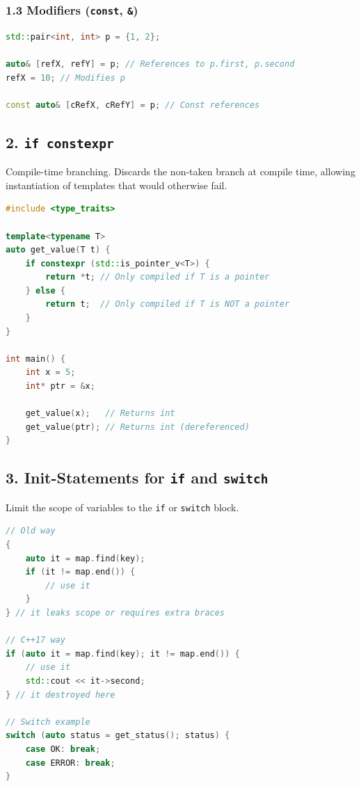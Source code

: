 \hypertarget{modifiers-const}{%
\subsubsection{\texorpdfstring{1.3 Modifiers (\texttt{const},
\texttt{\&})}{1.3 Modifiers (const, \&)}}\label{modifiers-const}}

\begin{lstlisting}[language={C++}]
std::pair<int, int> p = {1, 2};

auto& [refX, refY] = p; // References to p.first, p.second
refX = 10; // Modifies p

const auto& [cRefX, cRefY] = p; // Const references
\end{lstlisting}

\hypertarget{if-constexpr}{%
\subsection{\texorpdfstring{2.
\texttt{if\ constexpr}}{2. if constexpr}}\label{if-constexpr}}

Compile-time branching. Discards the non-taken branch at compile time,
allowing instantiation of templates that would otherwise fail.

\begin{lstlisting}[language={C++}]
#include <type_traits>

template<typename T>
auto get_value(T t) {
    if constexpr (std::is_pointer_v<T>) {
        return *t; // Only compiled if T is a pointer
    } else {
        return t;  // Only compiled if T is NOT a pointer
    }
}

int main() {
    int x = 5;
    int* ptr = &x;

    get_value(x);   // Returns int
    get_value(ptr); // Returns int (dereferenced)
}
\end{lstlisting}

\hypertarget{init-statements-for-if-and-switch}{%
\subsection{\texorpdfstring{3. Init-Statements for \texttt{if} and
\texttt{switch}}{3. Init-Statements for if and switch}}\label{init-statements-for-if-and-switch}}

Limit the scope of variables to the \passthrough{\lstinline!if!} or
\passthrough{\lstinline!switch!} block.

\begin{lstlisting}[language={C++}]
// Old way
{
    auto it = map.find(key);
    if (it != map.end()) {
        // use it
    }
} // it leaks scope or requires extra braces

// C++17 way
if (auto it = map.find(key); it != map.end()) {
    // use it
    std::cout << it->second;
} // it destroyed here

// Switch example
switch (auto status = get_status(); status) {
    case OK: break;
    case ERROR: break;
}
\end{lstlisting}

